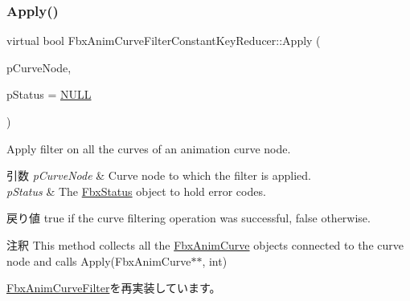 \subsubsection{\texorpdfstring{Apply()}{Apply()}\hspace{0.1cm}{\footnotesize\ttfamily [4/5]}}
{\footnotesize\ttfamily virtual bool Fbx\+Anim\+Curve\+Filter\+Constant\+Key\+Reducer\+::\+Apply (\begin{DoxyParamCaption}\item[{\hyperlink{class_fbx_anim_curve_node}{Fbx\+Anim\+Curve\+Node} \&}]{p\+Curve\+Node,  }\item[{\hyperlink{class_fbx_status}{Fbx\+Status} $\ast$}]{p\+Status = {\ttfamily \hyperlink{fbxarch_8h_a070d2ce7b6bb7e5c05602aa8c308d0c4}{N\+U\+LL}} }\end{DoxyParamCaption})\hspace{0.3cm}{\ttfamily [virtual]}}

Apply filter on all the curves of an animation curve node. 
\begin{DoxyParams}{引数}
{\em p\+Curve\+Node} & Curve node to which the filter is applied. \\
\hline
{\em p\+Status} & The \hyperlink{class_fbx_status}{Fbx\+Status} object to hold error codes. \\
\hline
\end{DoxyParams}
\begin{DoxyReturn}{戻り値}
{\ttfamily true} if the curve filtering operation was successful, {\ttfamily false} otherwise. 
\end{DoxyReturn}
\begin{DoxyRemark}{注釈}
This method collects all the \hyperlink{class_fbx_anim_curve}{Fbx\+Anim\+Curve} objects connected to the curve node and calls Apply(\+Fbx\+Anim\+Curve$\ast$$\ast$, int) 
\end{DoxyRemark}


\hyperlink{class_fbx_anim_curve_filter_ad042b45c0675278fa49e61739b0825c2}{Fbx\+Anim\+Curve\+Filter}を再実装しています。

\mbox{\label{class_fbx_anim_curve_filter_constant_key_reducer_a45c9f6f26dc37686d684e1a35ac6b4c0}} 
